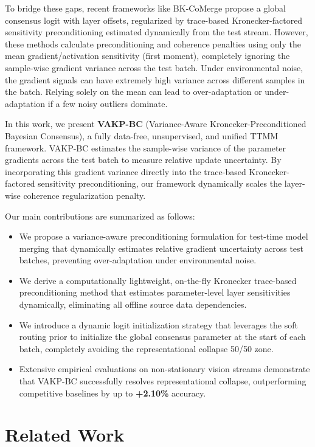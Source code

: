\documentclass{article}
\theoremstyle{plain}
\theoremstyle{definition}
\theoremstyle{remark}
\begin{document}
To bridge these gaps, recent frameworks like BK-CoMerge \cite{bk_comerge} propose a global consensus logit with layer offsets, regularized by trace-based Kronecker-factored sensitivity preconditioning estimated dynamically from the test stream. However, these methods calculate preconditioning and coherence penalties using only the mean gradient/activation sensitivity (first moment), completely ignoring the sample-wise gradient variance across the test batch. Under environmental noise, the gradient signals can have extremely high variance across different samples in the batch. Relying solely on the mean can lead to over-adaptation or under-adaptation if a few noisy outliers dominate. 

In this work, we present \textbf{VAKP-BC} (Variance-Aware Kronecker-Preconditioned Bayesian Consensus), a fully data-free, unsupervised, and unified TTMM framework. VAKP-BC estimates the sample-wise variance of the parameter gradients across the test batch to measure relative update uncertainty. By incorporating this gradient variance directly into the trace-based Kronecker-factored sensitivity preconditioning, our framework dynamically scales the layer-wise coherence regularization penalty.

Our main contributions are summarized as follows:
\begin{itemize}
    \item We propose a variance-aware preconditioning formulation for test-time model merging that dynamically estimates relative gradient uncertainty across test batches, preventing over-adaptation under environmental noise.
    \item We derive a computationally lightweight, on-the-fly Kronecker trace-based preconditioning method that estimates parameter-level layer sensitivities dynamically, eliminating all offline source data dependencies.
    \item We introduce a dynamic logit initialization strategy that leverages the soft routing prior to initialize the global consensus parameter at the start of each batch, completely avoiding the representational collapse 50/50 zone.
    \item Extensive empirical evaluations on non-stationary vision streams demonstrate that VAKP-BC successfully resolves representational collapse, outperforming competitive baselines by up to \textbf{+2.10\%} accuracy.
\end{itemize}

\section{Related Work}
\label{sec:related}
\end{document}
